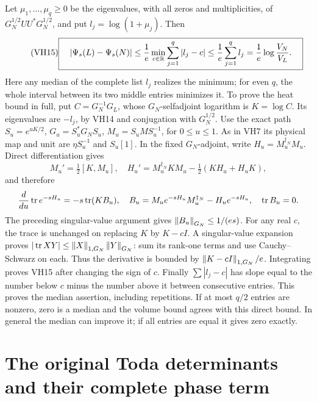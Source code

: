 \documentclass[11pt]{article}
\begin{document}
Let \(\mu_1,\ldots,\mu_q\ge0\) be the eigenvalues, with all zeros
and multiplicities, of \(G_N^{1/2}UU^*G_N^{1/2}\), and put
\(l_j=\log(1+\mu_j)\). Then
\begin{equation}\tag{VH15}\label{hvh:VH15}
\boxed{\quad
|\Psi_s(L)-\Psi_s(N)|
\le\frac1e\min_{c\in\mathbb R}\sum_{j=1}^q|l_j-c|
\le\frac1e\sum_{j=1}^q l_j
=\frac1e\log\frac{V_N}{V_L}.\quad}
\end{equation}
Here any median of the complete list \(l_j\) realizes the minimum;
for even \(q\), the whole interval between its two middle entries
minimizes it. To prove the heat bound in full, put
\(C=G_N^{-1}G_L\), whose \(G_N\)-selfadjoint logarithm is
\(K=\log C\). Its eigenvalues are \(-l_j\), by VH14 and conjugation
with \(G_N^{1/2}\). Use the exact path
\(S_u=e^{uK/2}\), \(G_u=S_u^*G_NS_u\), \(M_u=S_uMS_u^{-1}\),
for \(0\le u\le1\). As in VH7 its physical map and unit are
\(\eta S_u^{-1}\) and \(S_u[1]\).
In the fixed \(G_N\)-adjoint, write \(H_u=M_u^{\dagger_N}M_u\).
Direct differentiation gives
\[
M_u'=\tfrac12[K,M_u],\quad
H_u'=M_u^{\dagger_N}KM_u-\tfrac12(KH_u+H_uK),
\]
and therefore
\[
\frac d{du}\operatorname{tr} e^{-sH_u}=-s\operatorname{tr}(KB_u),\quad
B_u=M_u e^{-sH_u}M_u^{\dagger_N}-H_u e^{-sH_u},\quad\operatorname{tr} B_u=0.
\]
The preceding singular-value argument gives \(\left\lVert B_u\right\rVert_{G_N}\le1/(es)\).
For any real \(c\), the trace is unchanged on replacing \(K\) by
\(K-cI\). A singular-value expansion proves
\(|\operatorname{tr} XY|\le\left\lVert X\right\rVert_{1,G_N}\left\lVert Y\right\rVert_{G_N}\): sum its rank-one terms
and use Cauchy--Schwarz on each. Thus the derivative is bounded by
\(\left\lVert K-cI\right\rVert_{1,G_N}/e\). Integrating proves VH15 after changing
the sign of \(c\). Finally \(\sum|l_j-c|\) has slope equal to the
number below \(c\) minus the number above it between consecutive
entries. This proves the median assertion, including repetitions.
If at most \(q/2\) entries are nonzero, zero is a median and the
volume bound agrees with this direct bound. In general the median
can improve it; if all entries are equal it gives zero exactly.

\section{The original Toda determinants and their complete phase term}
\end{document}
